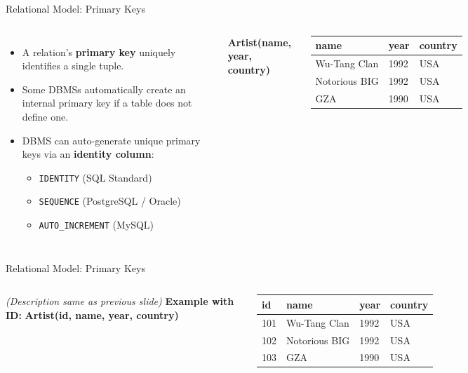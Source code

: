 \documentclass[aspectratio=169, 10pt]{beamer}
\begin{document}
\begin{frame}{Relational Model: Primary Keys}
    \begin{columns}
        \begin{itemize}
            \item A relation's \textbf{primary key} uniquely identifies a single tuple.
            \item Some DBMSs automatically create an internal primary key if a table does not define one.
            \item DBMS can auto-generate unique primary keys via an \textbf{identity column}:
            \begin{itemize}
                \item \texttt{IDENTITY} (SQL Standard)
                \item \texttt{SEQUENCE} (PostgreSQL / Oracle)
                \item \texttt{AUTO\_INCREMENT} (MySQL)
            \end{itemize}
        \end{itemize}
        \small
        \textbf{Artist(name, year, country)}
        \begin{table}
        \begin{tabular}{lll}
        \toprule
        \textbf{name} & \textbf{year} & \textbf{country} \\
        \midrule
        Wu-Tang Clan & 1992 & USA \\
        Notorious BIG & 1992 & USA \\
        GZA & 1990 & USA \\
        \bottomrule
        \end{tabular}
        \end{table}
    \end{columns}
\end{frame}

\begin{frame}{Relational Model: Primary Keys}
    \begin{columns}
        \textit{(Description same as previous slide)}
        \vspace{1em}
        \textbf{Example with ID:}
        \small
        \textbf{Artist(id, name, year, country)}
        \begin{table}
        \begin{tabular}{llll}
        \toprule
        \textbf{id} & \textbf{name} & \textbf{year} & \textbf{country} \\
        \midrule
        101 & Wu-Tang Clan & 1992 & USA \\
        102 & Notorious BIG & 1992 & USA \\
        103 & GZA & 1990 & USA \\
        \bottomrule
        \end{tabular}
        \end{table}
    \end{columns}
\end{frame}
\end{document}
